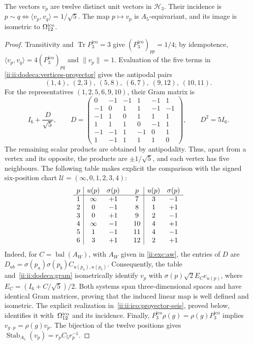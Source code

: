 \begin{proposition}
\label{ii:ii:dodeca:realizacion}
The vectors \(v_p\) are twelve distinct unit vectors in
\(\mathcal H_3\). Their incidence is
\(p\sim q\Longleftrightarrow\langle v_p,v_q\rangle=1/\sqrt5\).
The map \(p\mapsto v_p\) is \(A_5\)-equivariant, and its image
is isometric to \(\Omega_{12}^{\rm ico}\).
\end{proposition}
\begin{proof}
Transitivity and \(\operatorname{Tr}P_3^{\mathrm{ico}}=3\) give
\((P_3^{\mathrm{ico}})_{pp}=1/4\); by idempotence,
\(\langle v_p,v_q\rangle=4(P_3^{\mathrm{ico}})_{pq}\) and \(\|v_p\|=1\).
Evaluation of the five terms in
\eqref{ii:ii:dodeca:vertices-proyector} gives the antipodal pairs
\[
 (1,4),\ (2,3),\ (5,8),\ (6,7),\ (9,12),\ (10,11).
\]
For the representatives \((1,2,5,6,9,10)\), their Gram matrix is
\begin{equation}
 I_6+\frac D{\sqrt5},\qquad
 D=\begin{pmatrix}
 0&-1&-1&1&-1&1\\
 -1&0&1&1&-1&-1\\
 -1&1&0&1&1&1\\
 1&1&1&0&-1&1\\
 -1&-1&1&-1&0&1\\
 1&-1&1&1&1&0
 \end{pmatrix},\qquad D^2=5I_6.
 \label{ii:ii:dodeca:gram}
\end{equation}
The remaining scalar products are obtained by antipodality.
Thus, apart from a vertex and its opposite, the products are
\(\pm1/\sqrt5\), and each vertex has five neighbours. The following table
makes explicit the comparison with the signed six-position chart
\(\mathcal U=(\infty,0,1,2,3,4)\):
\begin{equation}
\begin{array}{c|cc@{\qquad}c|cc}
p&u(p)&\sigma(p)&p&u(p)&\sigma(p)\\ \hline
1&\infty&+1&7&3&-1\\
2&0&-1&8&1&+1\\
3&0&+1&9&2&-1\\
4&\infty&-1&10&4&+1\\
5&1&-1&11&4&-1\\
6&3&+1&12&2&+1
\end{array}
\label{ii:ii:dodeca:carta-firmada}
\end{equation}
Indeed, for \(C=\operatorname{bal}(A_W)\), with \(A_W\) given in
\eqref{ii:exc:aw}, the entries of \(D\) are
\(D_{ab}=\sigma(p_a)\sigma(p_b)C_{u(p_a),u(p_b)}\).
Consequently, the table and~\eqref{ii:ii:dodeca:gram} isometrically
identify \(v_p\) with
\(\sigma(p)\sqrt2 E_Ce_{u(p)}\), where
\(E_C=(I_6+C/\sqrt5)/2\). Both systems span three-dimensional
spaces and have identical Gram matrices, proving that the induced
linear map is well defined and isometric. The explicit
realization in~\eqref{ii:ii:ico:proyector-seis}, proved below,
identifies it with~\(\Omega_{12}^{\rm ico}\) and its incidence.
Finally, \(P_3^{\mathrm{ico}}\rho(g)=\rho(g)P_3^{\mathrm{ico}}\) implies
\(v_{g\cdot p}=\rho(g)v_p\). The bijection of the twelve positions gives
\(\operatorname{Stab}_{A_5}(v_p)=r_pC_5r_p^{-1}\).
\end{proof}

